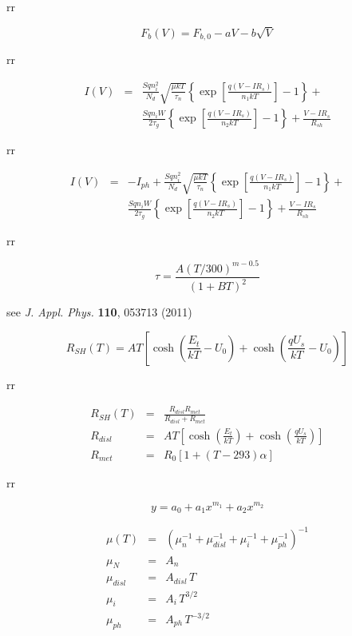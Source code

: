 \documentclass[14pt]{article}
\numberwithin{equation}{part}
\begin{document}
rr

\begin{equation*}
   F_b(V)=F_{b,0}-a V-b\sqrt{V}
\end{equation*}

rr

\begin{eqnarray*}
  I(V)&=&\frac{Sqn_i^2}{N_d}\sqrt{\frac{\mu k T}{\tau_n}}\left\{\exp \left[\frac{q(V-IR_s)}{n_1kT}\right]-1\right\}+\\
  &&\frac{Sqn_iW}{2\tau_g}\left\{\exp \left[\frac{q(V-IR_s)}{n_2kT}\right]-1\right\}+ \frac{V-IR_s}{R_{sh}}
\end{eqnarray*}


rr

\begin{eqnarray*}
  I(V)&=&-I_{ph}+\frac{Sqn_i^2}{N_d}\sqrt{\frac{\mu k T}{\tau_n}}\left\{\exp \left[\frac{q(V-IR_s)}{n_1kT}\right]-1\right\}+\\
  &&\frac{Sqn_iW}{2\tau_g}\left\{\exp \left[\frac{q(V-IR_s)}{n_2kT}\right]-1\right\}+ \frac{V-IR_s}{R_{sh}}
\end{eqnarray*}


rr

\begin{equation*}
  \tau=\frac{A(T/300)^{m-0.5}}{(1+BT)^2}
\end{equation*}

see \emph{J. Appl. Phys.} \textbf{110}, 053713 (2011)



\begin{equation*}
  R_{SH}(T)=AT\left[\cosh\left(\frac{E_t}{kT}-U_0\right)+\cosh\left(\frac{qU_s}{kT}-U_0\right)\right]
\end{equation*}

rr

\begin{eqnarray*}
    R_{SH}(T)&=&\frac{R_{disl}R_{met}}{R_{disl}+R_{met}}\\
    R_{disl}&=&AT\left[\cosh\left(\frac{E_t}{kT}\right)+\cosh\left(\frac{qU_s}{kT}\right)\right]\\
    R_{met}&=&R_0\left[1+(T-293)\alpha\right]
\end{eqnarray*}

rr

\begin{equation*}
  y=a_0+a_1x^{m_1}+a_2x^{m_2}
\end{equation*}

\begin{eqnarray*}
    \mu(T)&=&(\mu_n^{-1}+\mu_{disl}^{-1}+\mu_i^{-1}+\mu_{ph}^{-1})^{-1}\\
    \mu_N&=&A_n\\
    \mu_{disl}&=&A_{disl}\,T\\
    \mu_{i}&=&A_{i}\,T^{3/2}\\
    \mu_{ph}&=&A_{ph}\,T^{-3/2}
\end{eqnarray*}
\end{document}
